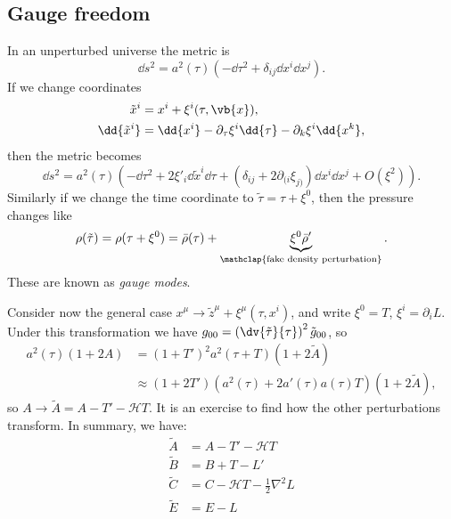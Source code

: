 \documentclass{jknotes}
\begin{document}
\subsection{Gauge freedom}

In an unperturbed universe the metric is
\begin{equation}
    \dd{s}^2=a^2(\tau)(-\dd{\tau}^2+\delta_{ij}\dd{x^i}\dd{x^j}).
\end{equation}
If we change coordinates
\begin{align}
    \tilde{x}^i &= x^i + \xi^i(\tau,\vb{x}),\\
    \dd{\tilde{x}^i} &= \dd{x^i} - \partial_\tau\xi^i\dd{\tau} - \partial_k\xi^i\dd{x^k},
\end{align}
then the metric becomes
\begin{equation}
    \dd{s}^2 = a^2(\tau)\left(-\dd{\tau}^2 + 2\xi'_i \dd{\tilde{x}^i}\dd{\tau} + (\delta_{ij} + 2\partial_{(i}\xi_{j)})\dd{x^i}\dd{x^j}+O(\xi^2)\right).
\end{equation}
Similarly if we change the time coordinate to \(\tilde{\tau} = \tau + \xi^0\), then the pressure changes like
\begin{equation}
    \rho(\tilde{\tau}) = \rho(\tau+\xi^0) = \bar{\rho}(\tau) + \underbrace{\xi^0\bar{\rho}'}_{\mathclap{\text{fake density perturbation}}}.
\end{equation}
These are known as \emph{gauge modes}.

Consider now the general case \(x^\mu \to \tilde{z}^\mu+\xi^\mu(\tau,x^i)\), and write \(\xi^0 = T\), \(\xi^i=\partial_iL\). Under this transformation we have \(g_{00} = \left(\dv{\tilde{\tau}}{\tau}\right)^2\tilde{g}_{00}\), so
\begin{align}
    a^2(\tau)(1+2A) &= (1+T')^2a^2(\tau+T)(1+2\tilde{A}) \\
                    &\approx (1+2T')(a^2(\tau) + 2a'(\tau)a(\tau)T)(1+2\tilde{A}),
\end{align}
so \(A \to \tilde{A} = A-T'-\mathcal{H}T\). It is an exercise to find how the other perturbations transform. In summary, we have:
\begin{align}
    \tilde{A} &= A - T' - \mathcal{H}T \\
    \tilde{B} &= B + T - L' \\
    \tilde{C} &= C - \mathcal{H}T - \frac{1}{2}\nabla^2L \\
    \tilde{E} &= E - L
\end{align}
\end{document}
